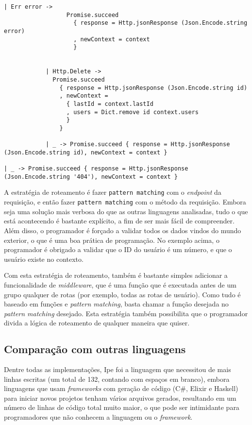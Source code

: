 \begin{lstlisting}[label={code:routes},caption={Roteamento da aplicação base}]
                | Err error ->
                  Promise.succeed
                    { response = Http.jsonResponse (Json.Encode.string error)
                    , newContext = context
                    }

            
            | Http.Delete ->
              Promise.succeed
                { response = Http.jsonResponse (Json.Encode.string id)
                , newContext =
                  { lastId = context.lastId
                  , users = Dict.remove id context.users
                  }
                }
          
            | _ -> Promise.succeed { response = Http.jsonResponse (Json.Encode.string id), newContext = context }

| _ -> Promise.succeed { response = Http.jsonResponse (Json.Encode.string '404'), newContext = context }
\end{lstlisting}

A estratégia de roteamento é fazer \texttt{pattern matching} com o \textit{endpoint} da requisição,
e então fazer \texttt{pattern matching} com o método da requisição. Embora seja uma solução mais
verbosa do que as outras linguagens analisadas, tudo o que está acontecendo é bastante explícito,
a fim de ser mais fácil de compreender. Além disso, o programador é forçado a validar todos os dados
vindos do mundo exterior, o que é uma boa prática de programação. No exemplo acima, o programador
é obrigado a validar que o ID do usuário é um número, e que o usuário existe no contexto.

Com esta estratégia de roteamento, também é bastante simples adicionar a funcionalidade de
\textit{middleware}, que é uma função que é executada antes de um grupo qualquer de rotas (por exemplo,
todas as rotas de usuário). Como tudo é baseado em funções e \textit{pattern matching}, basta chamar
a função desejada no \textit{pattern matching} desejado. Esta estratégia também possibilita que o
programador divida a lógica de roteamento de qualquer maneira que quiser.

\subsection{Comparação com outras linguagens}

Dentre todas as implementações, Ipe foi a linguagem que necessitou de mais linhas escritas (um total
de 132, contando com espaços em branco), embora linguagens que usam \textit{frameworks} com geração
de código (C\#, Elixir e Haskell) para iniciar novos projetos tenham vários arquivos gerados, resultando
em um número de linhas de código total muito maior, o que pode ser intimidante para programadores
que não conhecem a linguagem ou o \textit{framework}.

